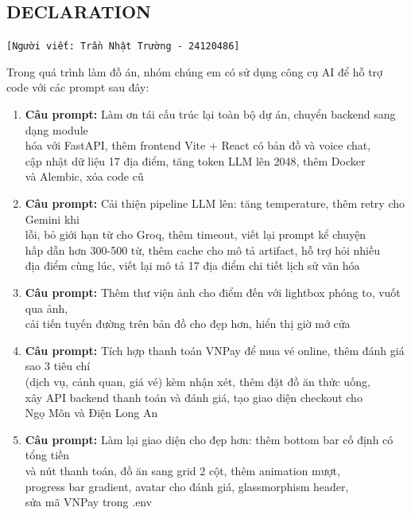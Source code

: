 \subsection{DECLARATION}
\texttt{[Người viết: Trần Nhật Trường - 24120486]}

Trong quá trình làm đồ án, nhóm chúng em có sử dụng công cụ AI để hỗ trợ code với các prompt sau đây:

\begin{enumerate}
\item \textbf{Câu prompt:} Làm ơn tái cấu trúc lại toàn bộ dự án, chuyển backend sang dạng module \\
hóa với FastAPI, thêm frontend Vite + React có bản đồ và voice chat, \\
cập nhật dữ liệu 17 địa điểm, tăng token LLM lên 2048, thêm Docker \\
và Alembic, xóa code cũ \\


\item \textbf{Câu prompt:} Cải thiện pipeline LLM lên: tăng temperature, thêm retry cho Gemini khi \\
lỗi, bỏ giới hạn từ cho Groq, thêm timeout, viết lại prompt kể chuyện \\
hấp dẫn hơn 300-500 từ, thêm cache cho mô tả artifact, hỗ trợ hỏi nhiều \\
địa điểm cùng lúc, viết lại mô tả 17 địa điểm chi tiết lịch sử văn hóa \\


\item \textbf{Câu prompt:} Thêm thư viện ảnh cho điểm đến với lightbox phóng to, vuốt qua ảnh, \\
cải tiến tuyến đường trên bản đồ cho đẹp hơn, hiển thị giờ mở cửa \\


\item \textbf{Câu prompt:} Tích hợp thanh toán VNPay để mua vé online, thêm đánh giá sao 3 tiêu chí \\
(dịch vụ, cảnh quan, giá vé) kèm nhận xét, thêm đặt đồ ăn thức uống, \\
xây API backend thanh toán và đánh giá, tạo giao diện checkout cho \\
Ngọ Môn và Điện Long An \\


\item \textbf{Câu prompt:} Làm lại giao diện cho đẹp hơn: thêm bottom bar cố định có tổng tiền \\
và nút thanh toán, đồ ăn sang grid 2 cột, thêm animation mượt, \\
progress bar gradient, avatar cho đánh giá, glassmorphism header, \\
sửa mã VNPay trong .env \\



\end{enumerate}
